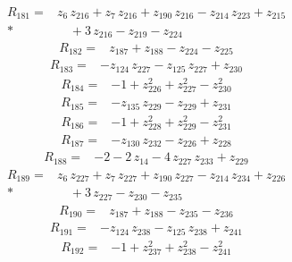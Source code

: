 \documentclass[10pt]{article}
\begin{document}
\begin{align*}
R_{181}={}& z_{6}\,z_{216} + z_{7}\,z_{216} + z_{190}\,z_{216} - z_{214}\,z_{223} + z_{215} \\*
&\quad + 3\,z_{216} - z_{219} - z_{224}
\end{align*}
\begin{align*}
R_{182}={}& z_{187} + z_{188} - z_{224} - z_{225}
\end{align*}
\begin{align*}
R_{183}={}& - z_{124}\,z_{227} - z_{125}\,z_{227} + z_{230}
\end{align*}
\begin{align*}
R_{184}={}& - 1 + z_{226}^{2} + z_{227}^{2} - z_{230}^{2}
\end{align*}
\begin{align*}
R_{185}={}& - z_{135}\,z_{229} - z_{229} + z_{231}
\end{align*}
\begin{align*}
R_{186}={}& - 1 + z_{228}^{2} + z_{229}^{2} - z_{231}^{2}
\end{align*}
\begin{align*}
R_{187}={}& - z_{130}\,z_{232} - z_{226} + z_{228}
\end{align*}
\begin{align*}
R_{188}={}& - 2 - 2\,z_{14} - 4\,z_{227}\,z_{233} + z_{229}
\end{align*}
\begin{align*}
R_{189}={}& z_{6}\,z_{227} + z_{7}\,z_{227} + z_{190}\,z_{227} - z_{214}\,z_{234} + z_{226} \\*
&\quad + 3\,z_{227} - z_{230} - z_{235}
\end{align*}
\begin{align*}
R_{190}={}& z_{187} + z_{188} - z_{235} - z_{236}
\end{align*}
\begin{align*}
R_{191}={}& - z_{124}\,z_{238} - z_{125}\,z_{238} + z_{241}
\end{align*}
\begin{align*}
R_{192}={}& - 1 + z_{237}^{2} + z_{238}^{2} - z_{241}^{2}
\end{align*}
\end{document}
